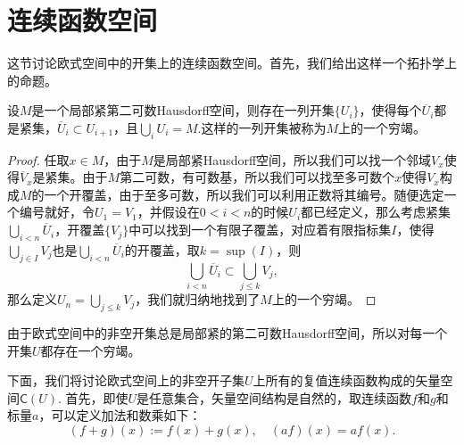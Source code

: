 \section{连续函数空间}

这节讨论欧式空间中的开集上的连续函数空间。首先，我们给出这样一个拓扑学上的命题。

\begin{thm}\label{thm:3.4}
设$M$是一个局部紧第二可数Hausdorff空间，则存在一列开集$\{U_i\}$，使得每个$\overline{U}_i$都是紧集，$\overline{U}_i\subset U_{i+1}$，且$\bigcup_iU_i=M$.这样的一列开集被称为$M$上的一个穷竭。
\end{thm}

\begin{proof}
任取$x\in M$，由于$M$是局部紧Hausdorff空间，所以我们可以找一个邻域$V_x$使得$\overline{V}_x$是紧集。由于$M$第二可数，有可数基，所以我们可以找至多可数个$x$使得$V_x$构成$M$的一个开覆盖，由于至多可数，所以我们可以利用正数将其编号。随便选定一个编号就好，令$U_1=V_1$，并假设在$0<i<n$的时候$U_i$都已经定义，那么考虑紧集$\bigcup_{i<n}\overline{U}_i$，开覆盖$\{V_j\}$中可以找到一个有限子覆盖，对应着有限指标集$I$，使得$\bigcup_{j\in I}V_j$也是$\bigcup_{i<n}\overline{U}_i$的开覆盖，取$k=\sup(I)$，则
\[
	\bigcup_{i<n}\overline{U}_i\subset \bigcup_{j\leq k}V_j,
\]
那么定义$U_n=\bigcup_{j\leq k}V_j$，我们就归纳地找到了$M$上的一个穷竭。
\end{proof}

由于欧式空间中的非空开集总是局部紧的第二可数Hausdorff空间，所以对每一个开集$U$都存在一个穷竭。

下面，我们将讨论欧式空间上的非空开子集$U$上所有的复值连续函数构成的矢量空间$\mathsf{C}(U)$. 首先，即使$U$是任意集合，矢量空间结构是自然的，取连续函数$f$和$g$和标量$a$，可以定义加法和数乘如下：
\[
	(f+g)(x):=f(x)+g(x),\quad (af)(x)=af(x).
\]

